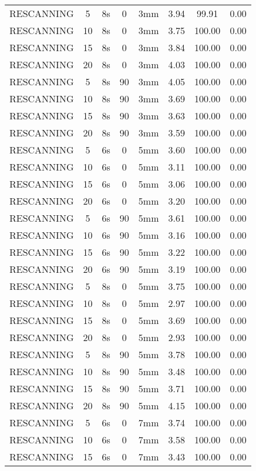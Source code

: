 \begin{table}[H]
\begin{tabular}{|c|c||c|c|c||c|c|c|}
RESCANNING & 5 & 8s & 0 & 3mm & 3.94 & 99.91 & 0.00 \\
RESCANNING & 10 & 8s & 0 & 3mm & 3.75 & 100.00 & 0.00 \\
RESCANNING & 15 & 8s & 0 & 3mm & 3.84 & 100.00 & 0.00 \\
RESCANNING & 20 & 8s & 0 & 3mm & 4.03 & 100.00 & 0.00 \\
RESCANNING & 5 & 8s & 90 & 3mm & 4.05 & 100.00 & 0.00 \\
RESCANNING & 10 & 8s & 90 & 3mm & 3.69 & 100.00 & 0.00 \\
RESCANNING & 15 & 8s & 90 & 3mm & 3.63 & 100.00 & 0.00 \\
RESCANNING & 20 & 8s & 90 & 3mm & 3.59 & 100.00 & 0.00 \\
RESCANNING & 5 & 6s & 0 & 5mm & 3.60 & 100.00 & 0.00 \\
RESCANNING & 10 & 6s & 0 & 5mm & 3.11 & 100.00 & 0.00 \\
RESCANNING & 15 & 6s & 0 & 5mm & 3.06 & 100.00 & 0.00 \\
RESCANNING & 20 & 6s & 0 & 5mm & 3.20 & 100.00 & 0.00 \\
RESCANNING & 5 & 6s & 90 & 5mm & 3.61 & 100.00 & 0.00 \\
RESCANNING & 10 & 6s & 90 & 5mm & 3.16 & 100.00 & 0.00 \\
RESCANNING & 15 & 6s & 90 & 5mm & 3.22 & 100.00 & 0.00 \\
RESCANNING & 20 & 6s & 90 & 5mm & 3.19 & 100.00 & 0.00 \\
RESCANNING & 5 & 8s & 0 & 5mm & 3.75 & 100.00 & 0.00 \\
RESCANNING & 10 & 8s & 0 & 5mm & 2.97 & 100.00 & 0.00 \\
RESCANNING & 15 & 8s & 0 & 5mm & 3.69 & 100.00 & 0.00 \\
RESCANNING & 20 & 8s & 0 & 5mm & 2.93 & 100.00 & 0.00 \\
RESCANNING & 5 & 8s & 90 & 5mm & 3.78 & 100.00 & 0.00 \\
RESCANNING & 10 & 8s & 90 & 5mm & 3.48 & 100.00 & 0.00 \\
RESCANNING & 15 & 8s & 90 & 5mm & 3.71 & 100.00 & 0.00 \\
RESCANNING & 20 & 8s & 90 & 5mm & 4.15 & 100.00 & 0.00 \\
RESCANNING & 5 & 6s & 0 & 7mm & 3.74 & 100.00 & 0.00 \\
RESCANNING & 10 & 6s & 0 & 7mm & 3.58 & 100.00 & 0.00 \\
RESCANNING & 15 & 6s & 0 & 7mm & 3.43 & 100.00 & 0.00 \\

\end{tabular}
\end{table}
